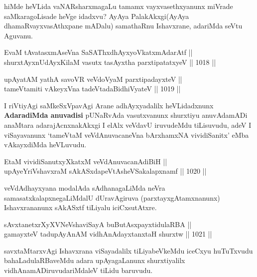 \begin{artha}
hiMde heVLida vaNARsharxmagaLu tamamx vayxvasethxyanunx miVrade saMkaragoLisade heVge idadxvu? AyAya PalakAkxgi(AyAya dhamaRvayxvasAthxpane mADalu) samathaRnu Ishavxrane, adariMda seVtu Aguvanu.
\end{artha}


\begin{shl}
EvaM tAvatasxmAseVna SaSAThxdhAyxyoVkatxmAdarAtf || \\
shurxtAyx\s nUdAyxKilaM vasutx tasAyxtha parxtipatatxyeV \hfill || 1018 ||  
\end{shl}
				
\begin{shl}
upAyatAM yathA savoVR veVdoV\s yaM parxtipadayxteV || \\
tameVtamiti vAkeyxVna tadeVtadaBidhiVyateV \hfill || 1019 ||  
\end{shl}

\begin{artha}
I riVtiyAgi saMkeSxVpavAgi Arane adhAyxyadalilx heVLidadxnunx \textbf{AdaradiMda anuvadisi}
pUNaRvAda vasutxvanunx shurxtiyu anuvAdamADi anaMtara adarajAcnxnakAkxgi I elAlx veVdavU iruvudeMdu tiLisuvudu, adeV I viSayavanunx `tameVtaM veVdAnuvacaneVna bArxhamxNA vividiSanitx' eMba vAkayxdiMda heVLuvudu.
\end{artha}


\begin{shl}
EtaM vividiSanutxyXkatxM veVdAnuvacanAdiBiH || \\
upAyeYriVshavxraM sAkASxdapeVtAsheVSakalapxnamf \hfill || 1020 ||  
\end{shl}

\begin{artha}
veVdAdhayxyana modalAda sAdhanagaLiMda neVra samasatxkalapxnegaLiMdalU dUravAgiruva (parxtayxgAtamxnanunx) Ishavxrananunx sAkASxtf tiLiyalu iciCxsutAtxre.
\end{artha}

\begin{shl}
sAvxtanetxrXyXVNeVshaviSayA buButAsx\s payxtidulaRBA || \\
gamayxteV tadupAyAnAM vidhAnAdayxtanxtaH shurxtw \hfill || 1021 ||  
\end{shl}

\begin{artha}
savxtaMtarxvAgi Ishavxrana viSayadalilx tiLiyabeVkeMdu iceCxyu huTuTxvudu bahaLadulaRBaveMdu adara upAyagaLanunx shurxtiyalilx vidhAnamADiruvudariMdaleV tiLidu baruvudu.
\end{artha}

